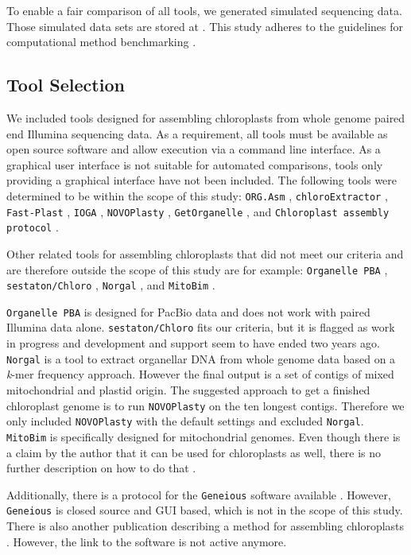 \documentclass{bmcart}
\newcommand{\formatprogramnames}[1]{\texttt{#1}}
\newcommand{\ce}{\formatprogramnames{chloroExtractor}}
\newcommand{\oa}{\formatprogramnames{ORG.Asm}}
\newcommand{\fp}{\formatprogramnames{Fast-Plast}}
\newcommand{\ioga}{\formatprogramnames{IOGA}}
\newcommand{\np}{\formatprogramnames{NOVOPlasty}}
\newcommand{\go}{\formatprogramnames{GetOrganelle}}
\newcommand{\cassp}{\formatprogramnames{Chloroplast assembly protocol}}
\newcommand{\zenododataset}{\cite{zenododataset}}
\begin{document}
To enable a fair comparison of all tools, we generated simulated sequencing data.
Those simulated data sets are stored at \zenododataset{}.
This study adheres to the guidelines for computational method benchmarking \cite{weber_essential_2018}.

\subsection*{Tool Selection}
We included tools designed for assembling chloroplasts from whole genome paired end Illumina sequencing data. As a requirement, all tools must be available as open source software and allow execution via a command line interface. 
As a graphical user interface is not suitable for automated comparisons, tools only providing a graphical interface have not been included.
The following tools were determined to be within the scope of this study:
\oa{} \cite{coissac_barcodes_2016}, 
\ce{} \cite{j_ankenbrand_chloroextractor:_2018}, 
\fp{} \cite{mckain__fast-plast_2017}, 
\ioga{} \cite{bakker_herbarium_2016}, 
\np{} \cite{dierckxsens_novoplasty:_2017}, 
\go{} \cite{jin_getorganelle:_2018}, and
\cassp{} \cite{sancho_comparative_2018}.

Other related tools for assembling chloroplasts that did not meet our criteria and are therefore outside the scope of this study are for example:
\texttt{Organelle PBA} \cite{Soorni2017}, \texttt{sestaton/Chloro} \cite{sestaton}, \texttt{Norgal}  \cite{Al-Nakeeb2017}, and \texttt{MitoBim} \cite{mitobim2013}.

\texttt{Organelle PBA} is designed for PacBio data and does not work with paired Illumina data alone.
\texttt{sestaton/Chloro} fits our criteria, but it is flagged as work in progress and development and support seem to have ended two years ago.
\texttt{Norgal} is a tool to extract organellar DNA from whole genome data based on a \textit{k}-mer frequency approach. However the final output is a set of contigs of mixed mitochondrial and plastid origin. The suggested approach to get a finished chloroplast genome is to run \np{} on the ten longest contigs. Therefore we only included \np{} with the default settings and excluded \texttt{Norgal}.
\texttt{MitoBim} is specifically designed for mitochondrial genomes. Even though there is a claim by the author that it can be used for chloroplasts as well, there is no further description on how to do that \cite{mitobim_issue16}.

Additionally, there is a protocol for the \texttt{Geneious} \cite{geneious} software available \cite{geneious-protocol}.
However, \texttt{Geneious} is closed source and GUI based, which is not in the scope of this study.
There is also another publication describing a method for assembling chloroplasts \cite{method-description-paper}.
However, the link to the software is not active anymore.
\end{document}
